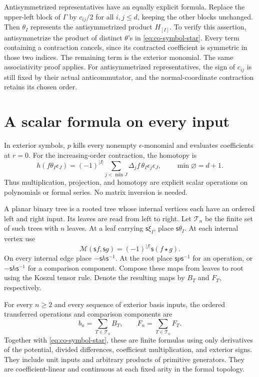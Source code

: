 Antisymmetrized representatives have an equally explicit formula.
Replace the upper-left block of \(\Gamma\) by \(c_{ij}/2\) for
all \(i,j\le d\), keeping the other blocks unchanged.
Then \(\theta_I\) represents the antisymmetrized product \(H_{[I]}\).
To verify this assertion, antisymmetrize the product of distinct
\(\theta\)'s in \eqref{eq:co-symbol-star}. Every term containing
a contraction cancels, since its contracted coefficient is symmetric
in those two indices. The remaining term is the exterior monomial.
The same associativity proof applies. For antisymmetrized representatives,
the sign of \(c_{ij}\) is still fixed by their actual anticommutator,
and the normal-coordinate contraction retains its chosen order.

\section{A scalar formula on every input}
\label{sec:co-tree-formula}

In exterior symbols, \(p\) kills every nonempty \(\epsilon\)-monomial
and evaluates coefficients at \(r=0\). For the increasing-order
contraction, the homotopy is
\[
 h(f\theta_I\epsilon_J)=(-1)^{|I|}
       \sum_{j<\min J}\Delta_j f\,\theta_I\epsilon_j\epsilon_J,
 \qquad \min\varnothing=d+1.
\]
Thus multiplication, projection, and homotopy are explicit scalar
operations on polynomials or formal series. No matrix inversion is needed.

A planar binary tree is a rooted tree whose internal vertices each
have an ordered left and right input. Its leaves are read from left
to right. Let \(\mathcal T_n\) be the finite set of such trees with
\(n\) leaves. At a leaf carrying \(\mathsf{s}\xi_I\), place
\(\mathsf{s}\theta_I\). At each internal vertex use
\[
 \mathcal M(\mathsf{s}f,\mathsf{s}g)=(-1)^{|f|}
                                      \mathsf{s}(f\star g).
\]
On every internal edge place \(-\mathsf{s}h\mathsf{s}^{-1}\).
At the root place \(\mathsf{s}p\mathsf{s}^{-1}\) for an operation,
or \(-\mathsf{s}h\mathsf{s}^{-1}\) for a comparison component.
Compose these maps from leaves to root using the Koszul tensor rule.
Denote the resulting maps by \(B_T\) and \(F_T\), respectively.

\begin{theorem}\label{thm:co-all-inputs}
For every \(n\ge2\) and every sequence of exterior basis inputs,
the ordered transferred operations and comparison components are
\[
 b_n=\sum_{T\in\mathcal T_n}B_T,\qquad
 F_n=\sum_{T\in\mathcal T_n}F_T.
\]
Together with \eqref{eq:co-symbol-star}, these are finite formulas
using only derivatives of the potential, divided differences,
coefficient multiplication, and exterior signs.
They include unit inputs and arbitrary products of primitive generators.
They are coefficient-linear and continuous at each fixed arity in
the formal topology.
\end{theorem}


